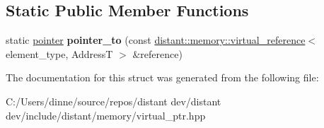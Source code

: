 \subsection*{Static Public Member Functions}
\begin{DoxyCompactItemize}
\item 
\mbox{\label{structstd_1_1pointer__traits_3_01distant_1_1memory_1_1virtual__ptr_3_01_element_00_01_address_t_01_4_01_4_a3c29fdfa5d4e3808379f5449d71406c5}} 
static \mbox{\hyperlink{classdistant_1_1memory_1_1virtual__ptr}{pointer}} {\bfseries pointer\+\_\+to} (const \mbox{\hyperlink{classdistant_1_1memory_1_1virtual__reference}{distant\+::memory\+::virtual\+\_\+reference}}$<$ element\+\_\+type, AddressT $>$ \&reference)
\end{DoxyCompactItemize}


The documentation for this struct was generated from the following file\+:\begin{DoxyCompactItemize}
\item 
C\+:/\+Users/dinne/source/repos/distant dev/distant dev/include/distant/memory/virtual\+\_\+ptr.\+hpp\end{DoxyCompactItemize}
